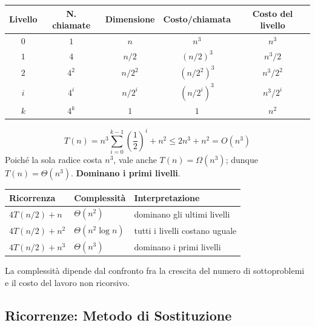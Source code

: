 \documentclass[12pt, a4paper]{article}
\begin{document}
\begin{tcolorbox}[colback=lightergray!10, colframe=tocsec, title=\textbf{Terzo Caso: $T(n) = 4T(n/2)+n^3$}]
\label{prop:ricorrenza-caso3}
\end{tcolorbox}
\begin{center}
\begin{tabular}{ccccc}
\toprule
\textbf{Livello} & \textbf{N. chiamate} & \textbf{Dimensione} & \textbf{Costo/chiamata} & \textbf{Costo del livello} \\
\midrule
$0$ & $1$ & $n$ & $n^3$ & $n^3$ \\
$1$ & $4$ & $n/2$ & $(n/2)^3$ & $n^3/2$ \\
$2$ & $4^2$ & $n/2^2$ & $(n/2^2)^3$ & $n^3/2^2$ \\
$i$ & $4^i$ & $n/2^i$ & $(n/2^i)^3$ & $n^3/2^i$ \\
$k$ & $4^k$ & $1$ & $1$ & $n^2$ \\
\bottomrule
\end{tabular}
\end{center}
$$T(n) = n^3\sum_{i=0}^{k-1}\left(\frac{1}{2}\right)^i + n^2 \le 2n^3+n^2 = O(n^3)$$
Poiché la sola radice costa $n^3$, vale anche $T(n)=\Omega(n^3)$; dunque $T(n)=\Theta(n^3)$. \textbf{Dominano i primi livelli}.

\begin{tcolorbox}[colback=lightergray!10, colframe=tocsec, title=\textbf{Tre Comportamenti, una Sola Idea}]
\end{tcolorbox}
\begin{center}
\begin{tabular}{lll}
\toprule
\textbf{Ricorrenza} & \textbf{Complessità} & \textbf{Interpretazione} \\
\midrule
$4T(n/2)+n$ & $\Theta(n^2)$ & dominano gli ultimi livelli \\
$4T(n/2)+n^2$ & $\Theta(n^2\log n)$ & tutti i livelli costano uguale \\
$4T(n/2)+n^3$ & $\Theta(n^3)$ & dominano i primi livelli \\
\bottomrule
\end{tabular}
\end{center}

\begin{tcolorbox}[colback=lightergray!5, colframe=tocsubsec, title=\textbf{Verso il Master Theorem}]
La complessità dipende dal confronto fra la crescita del numero di sottoproblemi e il costo del lavoro non ricorsivo.
\end{tcolorbox}


\subsection{Ricorrenze: Metodo di Sostituzione}
\label{sec:metodo-sostituzione}
\end{document}
